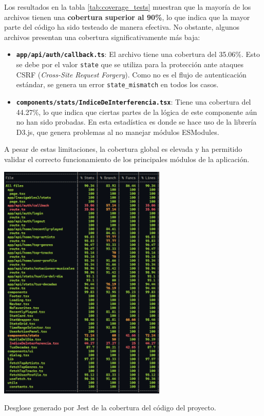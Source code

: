 Los resultados en la tabla \ref{tab:coverage_tests} muestran que la mayoría de los archivos tienen una \textbf{cobertura superior al 90\%}, lo que indica que la mayor parte del código ha sido testeado de manera efectiva. No obstante, algunos archivos presentan una cobertura significativamente más baja:

\begin{itemize}
    \item \textbf{\texttt{app/api/auth/callback.ts}}: El archivo tiene una cobertura del 35.06\%. Esto se debe por el valor \texttt{state} que se utiliza para la protección ante ataques CSRF (\textit{Cross-Site Request Forgery}). Como no es el flujo de autenticación estándar, se genera un error \texttt{state\_mismatch} en todos los casos.
    \item \textbf{\texttt{components/stats/IndiceDeInterferencia.tsx}}:  Tiene una cobertura del 44.27\%, lo que indica que ciertas partes de la lógica de este componente aún no han sido probadas. En esta estadística es donde se hace uso de la librería D3.js, que genera problemas al no manejar módulos ESModules.
\end{itemize}

A pesar de estas limitaciones, la cobertura global es elevada y ha permitido validar el correcto funcionamiento de los principales módulos de la aplicación.

\begin{table}[htbp]
    \centering
    \includegraphics[width=0.6\textwidth]{figures/coverage_tests.png}
    \captionsetup{skip=7pt}
    \caption{Desglose generado por Jest de la cobertura del código del proyecto.}
    \label{tab:coverage_tests}
\end{table}


